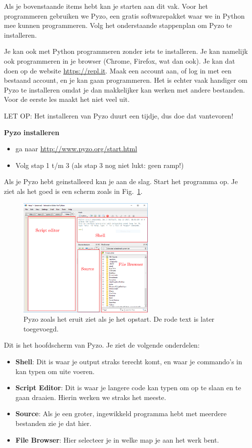 Als je bovenstaande items hebt kan je starten aan dit vak. Voor het programmeren gebruiken we Pyzo, een gratis softwarepakket waar we in Python mee kunnen programmeren. Volg het onderstaande stappenplan om Pyzo te installeren.

Je kan ook met Python programmeren zonder iets te installeren. Je kan namelijk ook programmeren in je browser (Chrome, Firefox, wat dan ook). Je kan dat doen op de website \href{https://repl.it}{https://repl.it}. Maak een account aan, of log in met een bestaand account, en je kan gaan programmeren. Het is echter vaak handiger om Pyzo te installeren omdat je dan makkelijker kan werken met andere bestanden. Voor de eerste les maakt het niet veel uit.

LET OP: Het installeren van Pyzo duurt een tijdje, dus doe dat vantevoren! 

\textbf{Pyzo installeren}
\begin{itemize}
\item ga naar \href{http://www.pyzo.org/start.html}{http://www.pyzo.org/start.html}
\item Volg stap 1 t/m 3 (als stap 3 nog niet lukt: geen ramp!)
\end{itemize}

Als je Pyzo hebt geinstalleerd kan je aan de slag. Start het programma op. Je ziet als het goed is een scherm zoals in Fig.~\ref{fig:pyzokaal}.

\begin{figure}[h]
\begin{center}
\includegraphics[width=0.6\textwidth]{img/pyzokaal.PNG}
\caption{\label{fig:pyzokaal} Pyzo zoals het eruit ziet als je het opstart. De rode text is later toegevoegd. }
\end{center}
\end{figure}

Dit is het hoofdscherm van Pyzo. Je ziet de volgende onderdelen:
\begin{itemize}
\item \textbf{Shell}: Dit is waar je output straks terecht komt, en waar je commando's in kan typen om uite voeren.
\item \textbf{Script Editor}: Dit is waar je langere code kan typen om op te slaan en te gaan draaien. Hierin werken we straks het meeste.
\item \textbf{Source}: Als je een groter, ingewikkeld programma hebt met meerdere bestanden zie je dat hier.
\item \textbf{File Browser}: Hier selecteer je in welke map je aan het werk bent.
\end{itemize}

